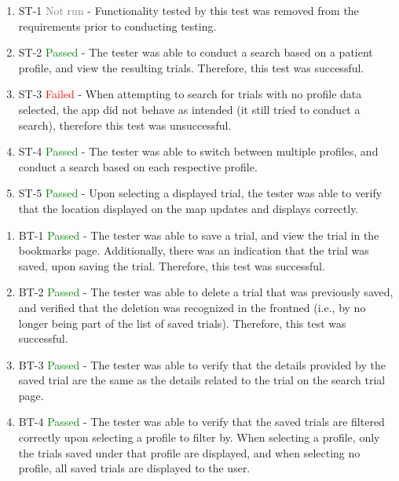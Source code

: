 \documentclass[12pt, titlepage]{article}
\begin{document}
\begin{enumerate}
  \item ST-1 \textcolor{gray}{Not run} - Functionality tested by this test was removed from the requirements prior to conducting testing.
  \item ST-2 \textcolor{green}{Passed} - The tester was able to conduct a search based on a patient profile, and view the resulting trials. Therefore, this test was
        successful.
  \item ST-3 \textcolor{red}{Failed} - When attempting to search for trials with no profile data selected, the app did not behave as intended (it
        still tried to conduct a search), therefore this test was unsuccessful.
  \item ST-4 \textcolor{green}{Passed} - The tester was able to switch between multiple profiles, and conduct a search based on each respective profile.
  \item ST-5 \textcolor{green}{Passed} - Upon selecting a displayed trial, the tester was able to verify that the location displayed on the map updates and displays correctly.\\

\end{enumerate}


\normalsize

\begin{enumerate}
  \item BT-1 \textcolor{green}{Passed} - The tester was able to save a trial, and view the trial in the bookmarks page. Additionally, there was an indication that
        the trial was saved, upon saving the trial. Therefore, this test was successful.
  \item BT-2 \textcolor{green}{Passed} - The tester was able to delete a trial that was previously saved, and verified that the deletion was recognized in the frontned (i.e., by
        no longer being part of the list of saved trials). Therefore, this test was successful.
  \item BT-3 \textcolor{green}{Passed} - The tester was able to verify that the details provided by the saved trial are the same as the details related to the trial
        on the search trial page.
  \item BT-4 \textcolor{green}{Passed} - The tester was able to verify that the saved trials are filtered correctly upon selecting a profile to filter by. When selecting a
        profile, only the trials saved under that profile are displayed, and when selecting no profile, all saved trials are displayed to the user.

\end{enumerate}
\end{document}
